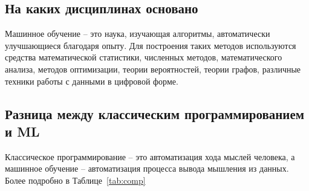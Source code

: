 \subsection{На каких дисциплинах основано}

Машинное обучение -- это наука, изучающая алгоритмы, автоматически улучшающиеся благодаря опыту.
Для построения таких методов используются средства математической статистики, численных методов,
математического анализа, методов оптимизации, теории вероятностей, теории графов, различные техники работы с
данными в цифровой форме.

\subsection{Разница между классическим программированием и ML}

Классическое программирование -- это автоматизация хода мыслей человека, а машинное обучение -- автоматизация
процесса вывода мышления из данных.
Более подробно в Таблице~\ref{tab:comp}

